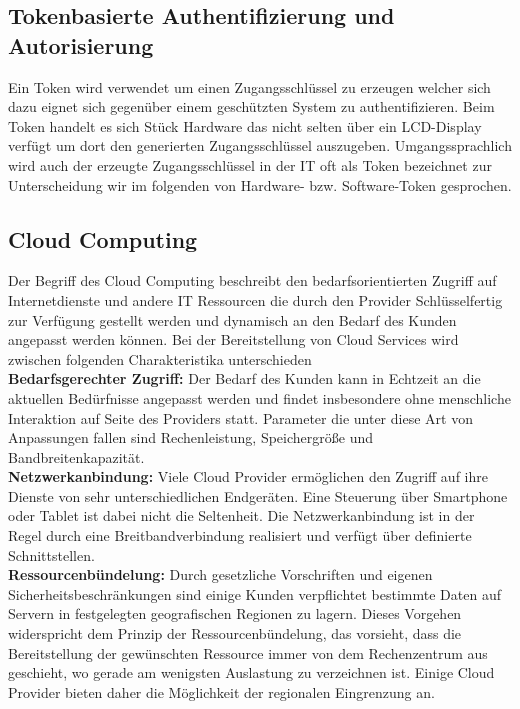 \documentclass[
book,
a4paper,   
titlepage,  
halfparskip,
12pt        
]{scrartcl}
\begin{document}
\begin{onehalfspacing}
\subsection{Tokenbasierte Authentifizierung und Autorisierung}
\label{subsec:token}
Ein Token wird verwendet um einen Zugangsschlüssel zu erzeugen welcher sich dazu eignet sich gegenüber einem geschützten System zu authentifizieren. Beim Token handelt es sich Stück Hardware das nicht selten über ein LCD-Display verfügt um dort den generierten Zugangsschlüssel auszugeben. Umgangssprachlich wird auch der erzeugte Zugangsschlüssel in der \ac{IT} oft als Token bezeichnet zur Unterscheidung wir im folgenden von Hardware- bzw. Software-Token gesprochen. 

\cite[S.141ff]{kerberos2}

\subsection{Cloud Computing}
\label{subsec:cloud}
Der Begriff des Cloud Computing beschreibt den bedarfsorientierten Zugriff auf Internetdienste und andere \ac{IT} Ressourcen die durch den Provider Schlüsselfertig zur Verfügung gestellt werden und dynamisch an den Bedarf des Kunden angepasst werden können. Bei der Bereitstellung von Cloud Services wird zwischen folgenden Charakteristika unterschieden\cite[S. 8]{cloudsec}\\
\textbf{Bedarfsgerechter Zugriff:} Der Bedarf des Kunden kann in Echtzeit an die aktuellen Bedürfnisse angepasst werden und findet insbesondere ohne menschliche Interaktion auf Seite des Providers statt. Parameter die unter diese Art von Anpassungen fallen sind Rechenleistung, Speichergröße und Bandbreitenkapazität.\cite[S. 8]{cloudsec}\\
\textbf{Netzwerkanbindung:}  Viele Cloud Provider ermöglichen den Zugriff auf ihre Dienste von sehr unterschiedlichen Endgeräten. Eine Steuerung über Smartphone oder Tablet ist dabei nicht die Seltenheit. Die Netzwerkanbindung ist in der Regel durch eine Breitbandverbindung realisiert und verfügt über definierte Schnittstellen.\cite[S. 8]{cloudsec}\\
\textbf{Ressourcenbündelung:} Durch gesetzliche Vorschriften und eigenen Sicherheitsbeschränkungen sind einige Kunden verpflichtet bestimmte Daten auf Servern in festgelegten geografischen Regionen zu lagern. Dieses Vorgehen widerspricht dem Prinzip der Ressourcenbündelung, das vorsieht, dass die Bereitstellung der gewünschten Ressource immer von dem Rechenzentrum aus geschieht, wo gerade am wenigsten Auslastung zu verzeichnen ist. Einige Cloud Provider bieten daher die Möglichkeit der regionalen Eingrenzung an.\cite[S. 8]{cloudsec}\\

\end{onehalfspacing}
\end{document}
